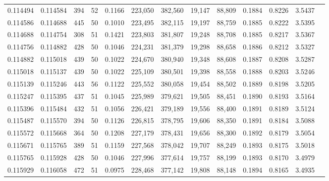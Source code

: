 \begin{tabular}{rrrrrrrrrrrrr}
0.114494 & 0.114584 &   394 &  52 &                                     0.1166 & 223,050 & 382,560 &  19,147 &  88,809 & 0.1884 & 0.8226 & 3.5437 \\
0.114586 & 0.114688 &   445 &  50 &                                     0.1010 & 223,495 & 382,115 &  19,197 &  88,759 & 0.1885 & 0.8222 & 3.5395 \\
0.114688 & 0.114754 &   308 &  51 &                                     0.1421 & 223,803 & 381,807 &  19,248 &  88,708 & 0.1885 & 0.8217 & 3.5367 \\
0.114756 & 0.114882 &   428 &  50 &                                     0.1046 & 224,231 & 381,379 &  19,298 &  88,658 & 0.1886 & 0.8212 & 3.5327 \\
0.114882 & 0.115018 &   439 &  50 &                                     0.1022 & 224,670 & 380,940 &  19,348 &  88,608 & 0.1887 & 0.8208 & 3.5287 \\
0.115018 & 0.115137 &   439 &  50 &                                     0.1022 & 225,109 & 380,501 &  19,398 &  88,558 & 0.1888 & 0.8203 & 3.5246 \\
0.115139 & 0.115246 &   443 &  56 &                                     0.1122 & 225,552 & 380,058 &  19,454 &  88,502 & 0.1889 & 0.8198 & 3.5205 \\
0.115247 & 0.115395 &   437 &  51 &                                     0.1045 & 225,989 & 379,621 &  19,505 &  88,451 & 0.1890 & 0.8193 & 3.5164 \\
0.115396 & 0.115484 &   432 &  51 &                                     0.1056 & 226,421 & 379,189 &  19,556 &  88,400 & 0.1891 & 0.8189 & 3.5124 \\
0.115487 & 0.115570 &   394 &  50 &                                     0.1126 & 226,815 & 378,795 &  19,606 &  88,350 & 0.1891 & 0.8184 & 3.5088 \\
0.115572 & 0.115668 &   364 &  50 &                                     0.1208 & 227,179 & 378,431 &  19,656 &  88,300 & 0.1892 & 0.8179 & 3.5054 \\
0.115671 & 0.115765 &   389 &  51 &                                     0.1159 & 227,568 & 378,042 &  19,707 &  88,249 & 0.1893 & 0.8175 & 3.5018 \\
0.115765 & 0.115928 &   428 &  50 &                                     0.1046 & 227,996 & 377,614 &  19,757 &  88,199 & 0.1893 & 0.8170 & 3.4979 \\
0.115929 & 0.116058 &   472 &  51 &                                     0.0975 & 228,468 & 377,142 &  19,808 &  88,148 & 0.1894 & 0.8165 & 3.4935 \\

\end{tabular}

